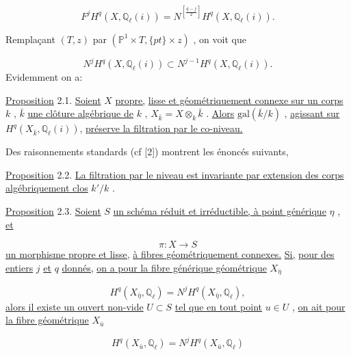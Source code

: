 \begin{equation}\tag{2.0.8}
F^j H^q(X, \mathbb{Q}_\ell(i)) = N^{\left[\frac{q-j}{2}\right]} H^q(X, \mathbb{Q}_\ell(i)) .
\end{equation}


Remplaçant  $(T, z)$  par  $(\mathbb{P}^1 \times T, \{pt\} \times z)$  , on voit que

\begin{equation}\tag{2.0.9}
N^j H^q(X, \mathbb{Q}_\ell(i)) \subset N^{j-1}H^q(X, \mathbb{Q}_\ell(i)) .
\end{equation}
Evidemment on a:

\underline{Proposition} 2.1.   \underline{Soient}  $X$  \underline{propre,} \underline{lisse et géométriquement connexe sur un corps}  $k$ ,  $\bar{k}$  \underline{une clôture algébrique de}  $k$ ,  $X_{\bar{k}} = X \otimes_k \bar{k}$  .  \underline{Alors}  $\mathrm{gal}(\bar{k}/k)$  , \underline{agissant sur}  $H^q(X_{\bar{k}}, \mathbb{Q}_\ell(i))$, \underline{préserve la filtration par le co-niveau.}

Des raisonnements standards (cf [2]) montrent les énoncés suivants,

\underline{Proposition} 2.2.  \underline{La filtration par le niveau est invariante par extension des corps algébriquement clos}  $k'/k$  .

\underline{Proposition} 2.3.   \underline{Soient}  $S$  \underline{un schéma réduit et irréductible, à point générique}  $\eta$  , \underline{et}

\begin{equation*}
\pi : X \longrightarrow S
\end{equation*}
\underline{un morphisme propre et lisse,} \underline{à fibres géométriquement connexes.} \underline{Si,} \underline{pour des entiers}  $j$  \underline{et}  $q$  \underline{donnés,} \underline{on a pour la fibre générique géométrique}  $X_{\bar{\eta}}$

\begin{equation}\tag{2.3.1}
H^q(X_{\bar{\eta}}, \mathbb{Q}_\ell) = N^j H^q(X_{\bar{\eta}}, \mathbb{Q}_\ell) ,
\end{equation}
\underline{alors il existe un ouvert non-vide}  $U \subset S$  \underline{tel que en tout point}  $u \in U$  , \underline{on ait pour la fibre géométrique}  $X_{\bar{u}}$

\begin{equation}\tag{2.3.2}
H^q(X_{\bar{u}}, \mathbb{Q}_\ell) = N^j H^q(X_{\bar{u}}, \mathbb{Q}_\ell)
\end{equation}

